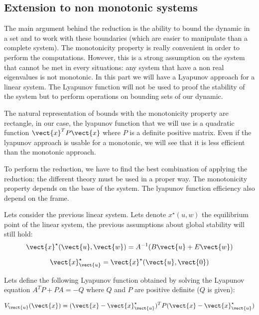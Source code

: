 \subsection{Extension to non monotonic systems}
The main argument behind the reduction is the ability to bound the dynamic in a set and to work with these boundaries (which are easier to manipulate than a complete system).
The monotonicity property is really convenient in order to perform the computations.
However, this is a strong assumption on the system that cannot be met in every situations: any system that have a non real eigenvalues is not monotonic.
In this part we will have a Lyapunov approach for a linear system.
The Lyapunov function will not be used to proof the stability of the system but to perform operations on bounding sets of our dynamic.

The natural representation of bounds with the monotonicity property are rectangle, in our case, the lyapunov function that we will use is a quadratic function $\vect{x}^T P \vect{x}$ where $P$ is a definite positive matrix.
Even if the lyapunov approach is usable for a monotonic, we will see that it is less efficient than the monotonic approach.

To perform the reduction, we have to find the best combination of applying the reduction: the different theory must be used in a proper way. The monotonicity property depends on the base of the system. The lyapunov function efficiency also depend on the frame.

Lets consider the previous linear system.
Lets denote $x^\star(u,w)$ the equilibrium point of the linear system, the previous assumptions about global stability will still hold:
\begin{equation}
\vect{x}^\star(\vect{u},\vect{w}) = A^{-1} (B \vect{u} + E \vect{w})
\end{equation}

\begin{equation}
\vect{x}^{\star}_{\vect{u}} = \vect{x}^\star(\vect{u},\vect{0})
\end{equation}

Lets define the following Lyapunov function obtained by solving the Lyapunov equation $A^T P + P A = -Q$ where $Q$ and $P$ are positive definite ($Q$ is given):

\newcommand{\xu}{\vect{x}^{\star}_{\vect{u}}}
\newcommand{\Vu}{V_{\vect{u}}}
\begin{equation}
\Vu(\vect{x}) = (\vect{x} - \xu) ^T P (\vect{x} - \xu) 
\end{equation}

